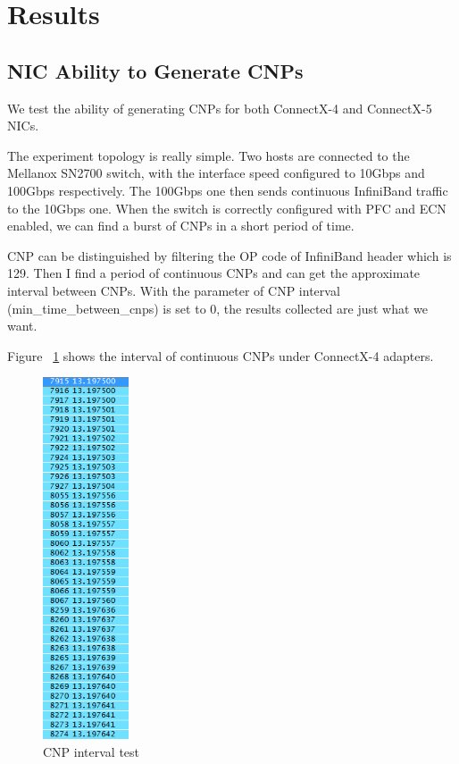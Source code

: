 \documentclass[12pt,a4paper]{article}
\begin{document}
\section{Results}

\subsection{NIC Ability to Generate CNPs}
We test the ability of generating CNPs for both ConnectX-4 and ConnectX-5 NICs.

The experiment topology is really simple.
Two hosts are connected to the Mellanox SN2700 switch, with the interface speed configured to 10Gbps and 100Gbps respectively.
The 100Gbps one then sends continuous InfiniBand traffic to the 10Gbps one.
When the switch is correctly configured with PFC and ECN enabled, we can find a burst of CNPs in a short period of time.

CNP can be distinguished by filtering the OP code of InfiniBand header which is 129.
Then I find a period of continuous CNPs and can get the approximate interval between CNPs.
With the parameter of CNP interval (min\_time\_between\_cnps) is set to 0, the results collected are just what we want.

Figure ~\ref{fig:CNPint} shows the interval of continuous CNPs under ConnectX-4 adapters.

\begin{figure}[ht]
	\begin{center}
		\includegraphics[width=1in]{CNPint}
		\caption{CNP interval test}
		\label{fig:CNPint}
	\end{center}
\end{figure}
\end{document}
